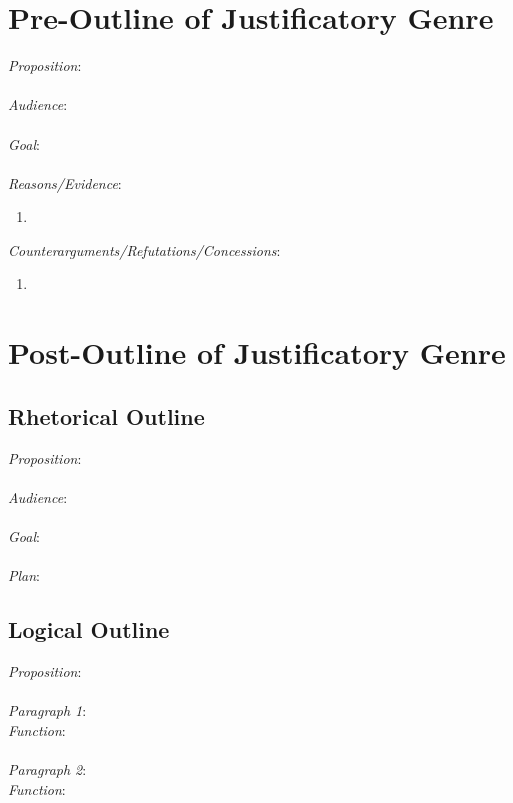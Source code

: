 \documentclass[12pt]{article}
\begin{document}
%
%






















\newpage
\section{Pre-Outline of Justificatory Genre}
\noindent \textit{Proposition}: \\ \\
\textit{Audience}: \\ \\
\textit{Goal}: \\ \\
\textit{Reasons/Evidence}:
\begin{enumerate}
	\item \
\end{enumerate}
\textit{Counterarguments/Refutations/Concessions}:
\begin{enumerate}
	\item \
\end{enumerate}

\newpage
\section{Post-Outline of Justificatory Genre}
\subsection*{Rhetorical Outline}
\noindent \textit{Proposition}: \\ \\
\textit{Audience}: \\ \\
\textit{Goal}: \\ \\
\textit{Plan}:
\subsection*{Logical Outline}
\noindent \textit{Proposition}: \\ \\
\textit{Paragraph 1}: \\
\indent \textit{Function}: \\ \\
\textit{Paragraph 2}: \\
\indent \textit{Function}: \\ \\
\end{document}

